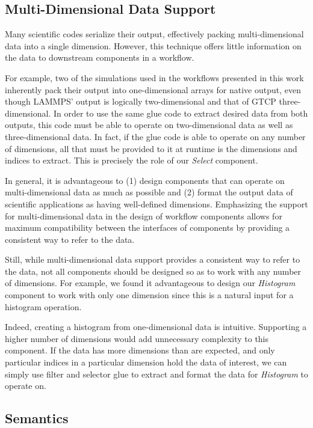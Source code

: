 \subsection{Multi-Dimensional Data Support}

Many scientific codes serialize their output, effectively packing
multi-dimensional data into a single dimension.
However, this technique offers
little information on the data to downstream
components in a workflow.

For example, two of the simulations used in the
workflows presented in this work inherently
pack their output into one-dimensional arrays
for native output, even
though LAMMPS' output is logically
two-dimensional and that
of GTCP three-dimensional.
In order to use the same glue code to
extract desired data from both outputs,
this code must be able to operate on two-dimensional data
as well as three-dimensional data.
In fact, if the glue code is able to operate
on any number of dimensions, all that must be provided to it
at runtime is the dimensions and indices to extract.
This is precisely the role of our
{\em Select} component.

In general, it is advantageous to (1) design
components that can operate on
multi-dimensional data as much as possible
and (2) format the output data of
scientific applications as having well-defined
dimensions. Emphasizing the support for multi-dimensional
data in the design of workflow components allows
for maximum compatibility between the interfaces
of components by providing a
consistent way to refer to the data.

Still, while multi-dimensional data support
provides a consistent way to refer
to the data, not all components should be
designed so as to work with
any number of dimensions.
For example, we found it advantageous to
design our {\em Histogram} component to work with
only one dimension since this is
a natural input for a histogram operation.

Indeed, creating a histogram from one-dimensional data is intuitive.
Supporting a higher number of dimensions
would add unnecessary complexity
to this component. If the data has more
dimensions than are expected,
and only particular indices in a particular
dimension hold the data of interest,
we can simply use filter and selector
glue to extract and format the data for
{\em Histogram} to operate on.
\fi

\subsection{Semantics}

